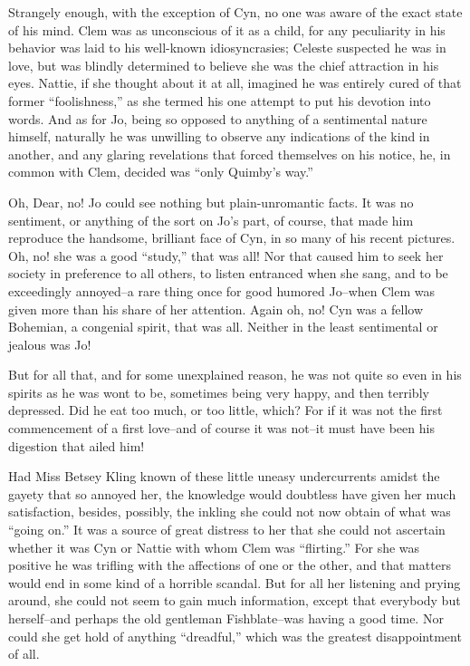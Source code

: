 Strangely enough, with the exception of Cyn, no one was aware of the
exact state of his mind. Clem was as unconscious of it as a child, for
any peculiarity in his behavior was laid to his well-known
idiosyncrasies; Celeste suspected he was in love, but was blindly
determined to believe she was the chief attraction in his eyes. Nattie,
if she thought about it at all, imagined he was entirely cured of that
former ``foolishness,'' as she termed his one attempt to put his devotion
into words. And as for Jo, being so opposed to anything of a sentimental
nature himself, naturally he was unwilling to observe any indications of
the kind in another, and any glaring revelations that forced themselves
on his notice, he, in common with Clem, decided was ``only Quimby's way.''

Oh, Dear, no! Jo could see nothing but plain-unromantic facts. It was no
sentiment, or anything of the sort on Jo's part, of course, that made
him reproduce the handsome, brilliant face of Cyn, in so many of his
recent pictures. Oh, no! she was a good ``study,'' that was all! Nor that
caused him to seek her society in preference to all others, to listen
entranced when she sang, and to be exceedingly annoyed--a rare thing
once for good humored Jo--when Clem was given more than his share of her
attention. Again oh, no! Cyn was a fellow Bohemian, a congenial
spirit, that was all. Neither in the least sentimental or jealous was Jo!

But for all that, and for some unexplained reason, he was not quite so
even in his spirits as he was wont to be, sometimes being very happy,
and then terribly depressed. Did he eat too much, or too little, which?
For if it was not the first commencement of a first love--and of course
it was not--it must have been his digestion that ailed him!

Had Miss Betsey Kling known of these little uneasy undercurrents amidst
the gayety that so annoyed her, the knowledge would doubtless have given
her much satisfaction, besides, possibly, the inkling she could not now
obtain of what was ``going on.'' It was a source of great distress to her
that she could not ascertain whether it was Cyn or Nattie with whom Clem
was ``flirting.'' For she was positive he was trifling with the affections
of one or the other, and that matters would end in some kind of a
horrible scandal. But for all her listening and prying around, she could
not seem to gain much information, except that everybody but
herself--and perhaps the old gentleman Fishblate--was having a good
time. Nor could she get hold of anything ``dreadful,'' which was the
greatest disappointment of all.

